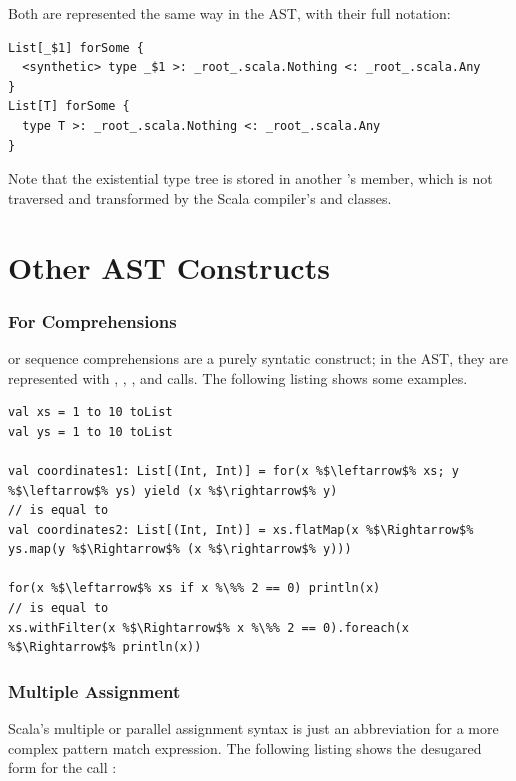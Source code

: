 Both are represented the same way in the AST, with their full notation:

\begin{lstlisting}
List[_$1] forSome { 
  <synthetic> type _$1 >: _root_.scala.Nothing <: _root_.scala.Any
}
List[T] forSome { 
  type T >: _root_.scala.Nothing <: _root_.scala.Any
}
\end{lstlisting}

Note that the existential type tree is stored in another 's  member, which is not traversed and transformed by the Scala compiler's  and  classes.

\section{Other AST Constructs}

\subsubsection*{For Comprehensions}

\noindent {} or sequence comprehensions are a purely syntatic construct; in the AST, they are represented with , , , and  calls. The following listing shows some examples. 

\begin{lstlisting}
val xs = 1 to 10 toList
val ys = 1 to 10 toList

val coordinates1: List[(Int, Int)] = for(x %$\leftarrow$% xs; y %$\leftarrow$% ys) yield (x %$\rightarrow$% y)
// is equal to
val coordinates2: List[(Int, Int)] = xs.flatMap(x %$\Rightarrow$% ys.map(y %$\Rightarrow$% (x %$\rightarrow$% y)))

for(x %$\leftarrow$% xs if x %\%% 2 == 0) println(x)
// is equal to
xs.withFilter(x %$\Rightarrow$% x %\%% 2 == 0).foreach(x %$\Rightarrow$% println(x))
\end{lstlisting}


\subsubsection*{Multiple Assignment}

\noindent Scala's multiple or parallel assignment syntax is just an abbreviation for a more complex pattern match expression. The following listing shows the desugared form for the call :

